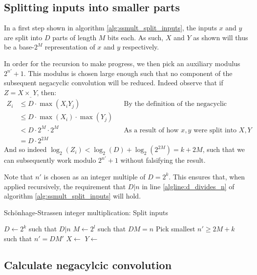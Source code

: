 \subsection{Splitting inputs into smaller parts}

In a first step shown in algorithm \ref{alg:ssmult_split_inputs}, the inputs
$x$ and $y$ are split into $D$ parts of length $M$ bits each. As such, $X$ and
$Y$ as shown will thus be a base-$2^M$ representation of $x$ and $y$
respectively.

In order for the recursion to make progress, we then pick an auxiliary modulus
$2^{n'} + 1$. This modulus is chosen large enough such that no component of the
subsequent negacyclic convolution will be reduced. Indeed observe that if $Z = X
\times_\_ Y$, then:
\begin{align*}
		Z_i & \leq D \cdot \max(X_i Y_j) && \text{By the definition of the negacyclic convolution} \\
			& \leq D \cdot \max(X_i) \cdot \max(Y_j) \\
			& < D \cdot 2^M \cdot 2^M && \text{As a result of how $x, y$ were split into $X, Y$} \\
			& = D \cdot 2^{2M}
\end{align*}
And so indeed $\log_2(Z_i) < \log_2(D) + \log_2(2^{2M}) = k + 2M$, such that we
can subsequently work modulo $2^{n'} + 1$ without falsifying the result.

Note that $n'$ is chosen as an integer multiple of $D = 2^k$. This ensures
that, when applied recursively, the requirement that $D | n$ in line
\ref{algline:d_divides_n} of algorithm \ref{alg:ssmult_split_inputs} will hold.

\begin{algorithm}
		\caption{Schönhage-Strassen integer multiplication: Split inputs}
		\begin{algorithmic}[1]
				\State $D \gets 2^k$ such that $D | n$
				\label{algline:d_divides_n}
				\State $M \gets 2^l$ such that $DM = n$
				\State Pick smallest $n' \geq 2M + k$ such that $n' = DM'$
				\State $X \gets $
				\State $Y \gets $
		\end{algorithmic}
		\label{alg:ssmult_split_inputs}
\end{algorithm}

\subsection{Calculate negacylcic convolution}

